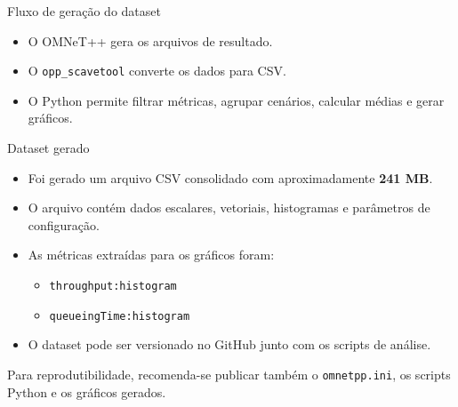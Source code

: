 \documentclass[aspectratio=169]{beamer}
\begin{document}
\begin{frame}{Fluxo de geração do dataset}
\centering
{}

\vspace{0.8cm}

\begin{itemize}
    \item O OMNeT++ gera os arquivos de resultado.
    \item O \texttt{opp\_scavetool} converte os dados para CSV.
    \item O Python permite filtrar métricas, agrupar cenários, calcular médias e gerar gráficos.
\end{itemize}
\end{frame}

\begin{frame}{Dataset gerado}
\begin{itemize}
    \item Foi gerado um arquivo CSV consolidado com aproximadamente \textbf{241 MB}.
    \item O arquivo contém dados escalares, vetoriais, histogramas e parâmetros de configuração.
    \item As métricas extraídas para os gráficos foram:
    \begin{itemize}
        \item \texttt{throughput:histogram}
        \item \texttt{queueingTime:histogram}
    \end{itemize}
    \item O dataset pode ser versionado no GitHub junto com os scripts de análise.
\end{itemize}

\begin{informacao}
Para reprodutibilidade, recomenda-se publicar também o \texttt{omnetpp.ini}, os scripts Python e os gráficos gerados.
\end{informacao}
\end{frame}
\end{document}
